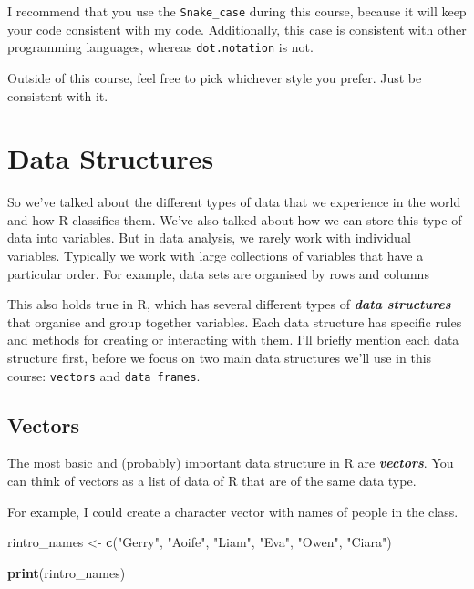 \documentclass[
]{book}
\newenvironment{Shaded}{\begin{snugshade}}{\end{snugshade}}
\newcommand{\FunctionTok}[1]{\textcolor[rgb]{0.13,0.29,0.53}{\textbf{#1}}}
\newcommand{\NormalTok}[1]{#1}
\newcommand{\OtherTok}[1]{\textcolor[rgb]{0.56,0.35,0.01}{#1}}
\newcommand{\StringTok}[1]{\textcolor[rgb]{0.31,0.60,0.02}{#1}}
\begin{document}
I recommend that you use the \texttt{Snake\_case} during this course, because it will keep your code consistent with my code. Additionally, this case is consistent with other programming languages, whereas \texttt{dot.notation} is not.

Outside of this course, feel free to pick whichever style you prefer. Just be consistent with it.

\hypertarget{data-structures}{%
\section{Data Structures}\label{data-structures}}

So we've talked about the different types of data that we experience in the world and how R classifies them. We've also talked about how we can store this type of data into variables. But in data analysis, we rarely work with individual variables. Typically we work with large collections of variables that have a particular order. For example, data sets are organised by rows and columns

This also holds true in R, which has several different types of \textbf{\emph{data structures}} that organise and group together variables. Each data structure has specific rules and methods for creating or interacting with them. I'll briefly mention each data structure first, before we focus on two main data structures we'll use in this course: \texttt{vectors} and \texttt{data\ frames}.

\hypertarget{vectors}{%
\subsection{Vectors}\label{vectors}}

The most basic and (probably) important data structure in R are \textbf{\emph{vectors}}. You can think of vectors as a list of data of R that are of the same data type.

For example, I could create a character vector with names of people in the class.

\begin{Shaded}
\begin{Highlighting}[]
\NormalTok{rintro\_names }\OtherTok{\textless{}{-}} \FunctionTok{c}\NormalTok{(}\StringTok{"Gerry"}\NormalTok{, }\StringTok{"Aoife"}\NormalTok{, }\StringTok{"Liam"}\NormalTok{, }\StringTok{"Eva"}\NormalTok{, }\StringTok{"Owen"}\NormalTok{, }\StringTok{"Ciara"}\NormalTok{)}


\FunctionTok{print}\NormalTok{(rintro\_names)}
\end{Highlighting}
\end{Shaded}
\end{document}
